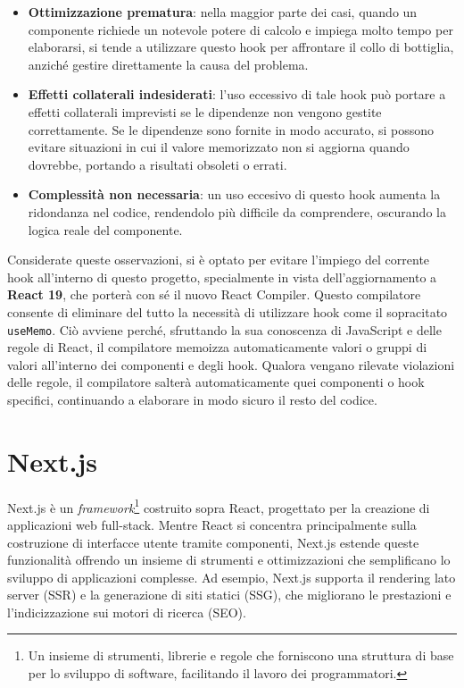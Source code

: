 \documentclass[target=bach,aauheader=,style=]{thud}
\begin{document}
\begin{itemize}
    \item \textbf{Ottimizzazione prematura}: nella maggior parte dei casi, quando un componente richiede un notevole potere di calcolo e impiega molto tempo per elaborarsi, si tende a utilizzare questo hook per affrontare il collo di bottiglia, anziché gestire direttamente la causa del problema.
    \item \textbf{Effetti collaterali indesiderati}: l'uso eccessivo di tale hook può portare a effetti collaterali imprevisti se le dipendenze non vengono gestite correttamente. Se le dipendenze sono fornite in modo accurato, si possono evitare situazioni in cui il valore memorizzato non si aggiorna quando dovrebbe, portando a risultati obsoleti o errati.
    \item \textbf{Complessità non necessaria}: un uso eccesivo di questo hook aumenta la ridondanza nel codice, rendendolo più difficile da comprendere, oscurando la logica reale del componente.
\end{itemize}

\noindent Considerate queste osservazioni, si è optato per evitare l'impiego del corrente hook all'interno di questo progetto, specialmente in vista dell'aggiornamento a \textbf{React 19}, che porterà con sé il nuovo React Compiler. Questo compilatore consente di eliminare del tutto la necessità di utilizzare hook come il sopracitato \texttt{useMemo}. Ciò avviene perché, sfruttando la sua conoscenza di JavaScript e delle regole di React, il compilatore memoizza automaticamente valori o gruppi di valori all'interno dei componenti e degli hook. Qualora vengano rilevate violazioni delle regole, il compilatore salterà automaticamente quei componenti o hook specifici, continuando a elaborare in modo sicuro il resto del codice.

\section{Next.js}
Next.js \cite{nextjsdocs2024} è un \textit{framework}\footnote{Un insieme di strumenti, librerie e regole che forniscono una struttura di base per lo sviluppo di software, facilitando il lavoro dei programmatori.} costruito sopra React, progettato per la creazione di applicazioni web full-stack. Mentre React si concentra principalmente sulla costruzione di interfacce utente tramite componenti, Next.js estende queste funzionalità offrendo un insieme di strumenti e ottimizzazioni che semplificano lo sviluppo di applicazioni complesse. Ad esempio, Next.js supporta il rendering lato server (SSR) e la generazione di siti statici (SSG), che migliorano le prestazioni e l'indicizzazione sui motori di ricerca (SEO).
\end{document}
